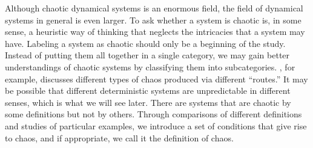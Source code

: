 \documentclass[10pt,twoside,draft]{book}
\begin{document}
Although chaotic dynamical systems is an enormous field, the field of dynamical systems in general is even larger.
To ask whether a system is chaotic is, in some sense, a heuristic way of thinking that neglects the intricacies that a system may have.
Labeling a system as chaotic should only be a beginning of the study.
Instead of putting them all together in a single category, we may gain better understandings of chaotic systems by classifying them into subcategories.
\citet{devaney}, for example, discusses different types of chaos produced via different ``routes.''
It may be possible that different deterministic systems are unpredictable in different senses, which is what we will see later.
There are systems that are chaotic by some definitions but not by others.
Through comparisons of different definitions and studies of particular examples, we introduce a set of conditions that give rise to chaos, and if appropriate, we call it the definition of chaos.



\end{document}
